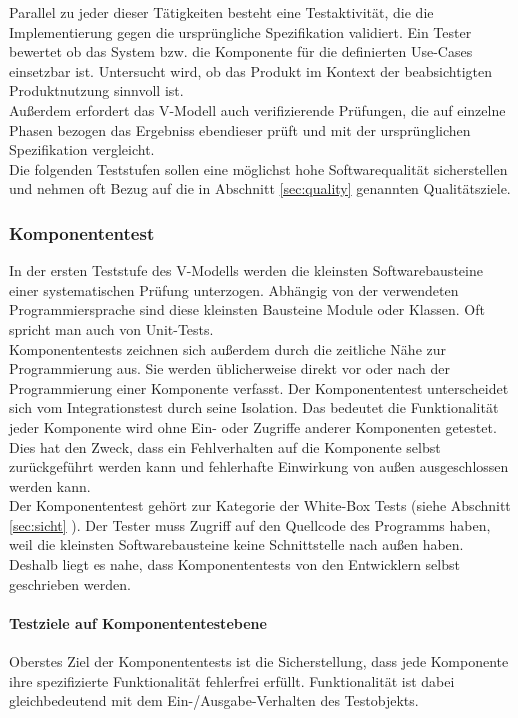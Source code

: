 Parallel zu jeder dieser Tätigkeiten besteht eine Testaktivität, die die Implementierung gegen die ursprüngliche Spezifikation validiert. Ein Tester bewertet ob das System bzw. die Komponente für die definierten Use-Cases einsetzbar ist. Untersucht wird, ob das Produkt im Kontext der beabsichtigten Produktnutzung sinnvoll ist\cite{spillner_basiswissen_2012}.\\
Außerdem erfordert das V-Modell auch verifizierende Prüfungen, die auf einzelne Phasen bezogen das Ergebniss ebendieser prüft und mit der ursprünglichen Spezifikation vergleicht.\\
Die folgenden Teststufen sollen eine möglichst hohe Softwarequalität sicherstellen und nehmen oft Bezug auf die in Abschnitt \ref{sec:quality} genannten Qualitätsziele.

\subsubsection{Komponententest}
In der ersten Teststufe des V-Modells werden die kleinsten Softwarebausteine einer systematischen Prüfung unterzogen. Abhängig von der verwendeten Programmiersprache sind diese kleinsten Bausteine Module oder Klassen. Oft spricht man auch von \Glspl{Unit-Test}.\\
Komponententests zeichnen sich außerdem durch die zeitliche Nähe zur Programmierung aus. Sie werden üblicherweise direkt vor oder nach der Programmierung einer Komponente verfasst. Der Komponententest unterscheidet sich vom Integrationstest durch seine Isolation. Das bedeutet die Funktionalität jeder Komponente wird ohne Ein- oder Zugriffe anderer Komponenten getestet. Dies hat den Zweck, dass ein Fehlverhalten auf die Komponente selbst zurückgeführt werden kann und fehlerhafte Einwirkung von außen ausgeschlossen werden kann.\\
Der Komponententest gehört zur Kategorie der White-Box Tests (siehe Abschnitt \ref{sec:sicht} ). Der Tester muss Zugriff auf den Quellcode des Programms haben, weil die kleinsten Softwarebausteine keine Schnittstelle nach außen haben. Deshalb liegt es nahe, dass Komponententests von den Entwicklern selbst geschrieben werden.

\paragraph{Testziele auf Komponententestebene}
Oberstes Ziel der Komponententests ist die Sicherstellung, dass jede Komponente ihre spezifizierte Funktionalität fehlerfrei erfüllt. Funktionalität ist dabei gleichbedeutend mit dem Ein-/Ausgabe-Verhalten des Testobjekts\cite{spillner_basiswissen_2012}.\\

